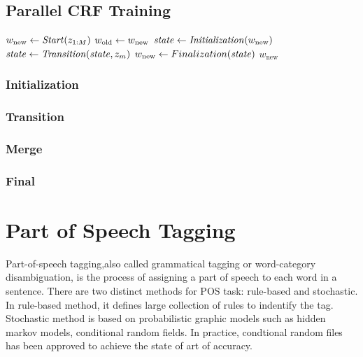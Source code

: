 \subsection{Parallel CRF Training}
\begin{algorithm} \label{alg:CRF training}
\begin{algorithmic}[1]
	\State $w_\text{new} \leftarrow \mathit{Start}(z_{1:M})$
	\Repeat
        \State $w_\text{old} \leftarrow w_\text{new}$
        \State $\mathit{state} \leftarrow \mathit{Initialization}(w_\text{new})$
		 
			\State $\mathit{state} \leftarrow \mathit{Transition}(\mathit{state}, z_m)$
		\EndFor
		\State $w_\text{new} \leftarrow Finalization(\mathit{state})$
    \State \Return $w_\text{new}$
\end{algorithmic}
\end{algorithm}

\subsubsection{Initialization}
\subsubsection{Transition}
\subsubsection{Merge}
\subsubsection{Final}

\section{Part of Speech Tagging}
Part-of-speech tagging,also called grammatical tagging or word-category disambiguation, is the process of assigning 
a part of speech to each word in a sentence. There are two distinct methods for POS task: rule-based and stochastic.
In rule-based method, it defines large collection of rules to indentify the tag. Stochastic method is based on probabilistic 
graphic models such as hidden markov models, conditional random fields. In practice, condtional random files has been approved 
to achieve the state of art of accuracy.
